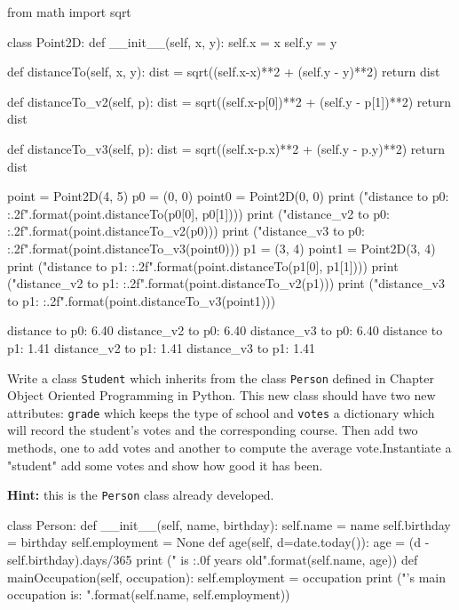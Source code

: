 \begin{ipython}
from math import sqrt

class Point2D:
    def __init__(self, x, y):
        self.x = x
        self.y = y

    def distanceTo(self, x, y):
        dist = sqrt((self.x-x)**2 + (self.y - y)**2)
        return dist

    def distanceTo_v2(self, p):
        dist = sqrt((self.x-p[0])**2 + (self.y - p[1])**2)
        return dist

    def distanceTo_v3(self, p):
        dist = sqrt((self.x-p.x)**2 + (self.y - p.y)**2)
        return dist

point = Point2D(4, 5)
p0 = (0, 0)
point0 = Point2D(0, 0)
print ("distance to p0: {:.2f}".format(point.distanceTo(p0[0], p0[1])))
print ("distance_v2 to p0: {:.2f}".format(point.distanceTo_v2(p0)))
print ("distance_v3 to p0: {:.2f}".format(point.distanceTo_v3(point0)))
p1 = (3, 4)
point1 = Point2D(3, 4)
print ("distance to p1: {:.2f}".format(point.distanceTo(p1[0], p1[1])))
print ("distance_v2 to p1: {:.2f}".format(point.distanceTo_v2(p1)))
print ("distance_v3 to p1: {:.2f}".format(point.distanceTo_v3(point1)))

distance to p0: 6.40
distance\_v2 to p0: 6.40
distance\_v3 to p0: 6.40
distance to p1: 1.41
distance\_v2 to p1: 1.41
distance\_v3 to p1: 1.41
\end{ipython}

\begin{question}
Write a class \texttt{Student} which inherits from the class \texttt{Person} defined in Chapter Object Oriented Programming in Python. This new class should have two new attributes: \texttt{grade} which keeps the type of school and \texttt{votes} a dictionary which will record the student's votes and the corresponding course. Then add two methods, one to add votes and another to compute the average vote.Instantiate a "student" add some votes and show how good it has been.

\noindent\textbf{Hint:} this is the \texttt{Person} class already developed.
\end{question}

\begin{ipython}
class Person:
def __init__(self, name, birthday):
self.name = name
self.birthday = birthday
self.employment = None
def age(self, d=date.today()):
age = (d - self.birthday).days/365
print ("{} is {:.0f} years old".format(self.name, age))
def mainOccupation(self, occupation):
self.employment = occupation
print ("{}'s main occupation is: {}".format(self.name, self.employment))
\end{ipython}

